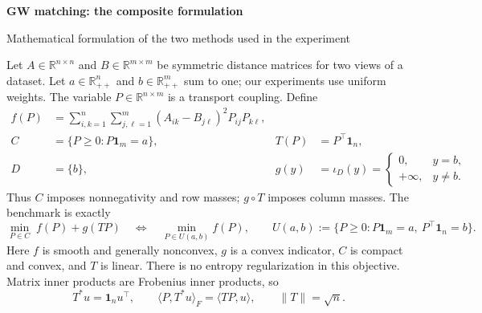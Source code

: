 \documentclass[11pt,a4paper]{article}
\newcommand{\one}{\mathbf{1}}
\newcommand{\R}{\mathbb{R}}
\newcommand{\ip}[2]{\langle #1,#2\rangle_F}
\begin{document}
{\color{ink}\fontsize{16}{19}\selectfont\bfseries GW matching: the composite formulation\par}
{\small Mathematical formulation of the two methods used in the experiment\par}
\vspace{3pt}

Let $A\in\R^{n\times n}$ and $B\in\R^{m\times m}$ be symmetric distance matrices for two views of a dataset. Let $a\in\R^n_{++}$ and $b\in\R^m_{++}$ sum to one; our experiments use uniform weights. The variable $P\in\R^{n\times m}$ is a transport coupling. Define
\begin{align*}
 f(P)&=\sum_{i,k=1}^{n}\sum_{j,\ell=1}^{m}(A_{ik}-B_{j\ell})^2P_{ij}P_{k\ell},\\
 C&=\{P\geq0:P\one_m=a\},
 &T(P)&=P^\top\one_n,\\
 D&=\{b\},
 &g(y)&=\iota_D(y)=\begin{cases}0,&y=b,\\+\infty,&y\ne b.\end{cases}
\end{align*}
Thus $C$ imposes nonnegativity and row masses; $g\circ T$ imposes column masses. The benchmark is exactly
\[
 \boxed{\min_{P\in C}\; f(P)+g(TP)}
 \quad\Longleftrightarrow\quad
 \min_{P\in U(a,b)}f(P),\qquad
 U(a,b):=\{P\geq0:P\one_m=a,\ P^\top\one_n=b\}.
\]
Here $f$ is smooth and generally nonconvex, $g$ is a convex indicator, $C$ is compact and convex, and $T$ is linear. There is no entropy regularization in this objective. Matrix inner products are Frobenius inner products, so
\[
 T^*u=\one_nu^\top,\qquad
 \ip{P}{T^*u}=\langle TP,u\rangle,\qquad \|T\|=\sqrt n.
\]
\end{document}
